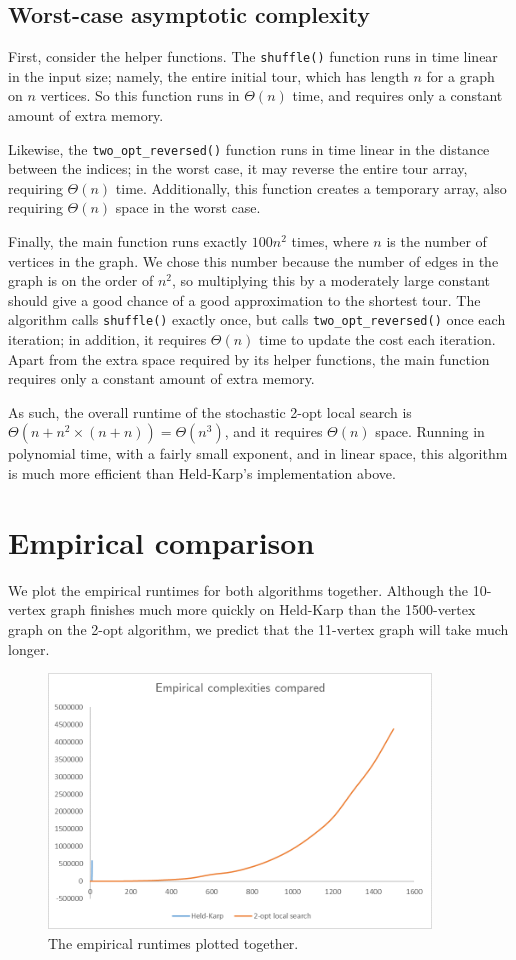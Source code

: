 \documentclass[10pt]{extarticle}
\begin{document}
\subsection{Worst-case asymptotic complexity}
First, consider the helper functions. The \verb|shuffle()| function runs in time
linear in the input size; namely, the entire initial tour, which has length $n$
for a graph on $n$ vertices. So this function runs in $\Theta(n)$ time, and 
requires only a constant amount of extra memory.

Likewise, the \verb|two_opt_reversed()| function runs in time linear in the
distance between the indices; in the worst case, it may reverse the entire 
tour array, requiring $\Theta(n)$ time. Additionally, this function creates a
temporary array, also requiring $\Theta(n)$ space in the worst case.

Finally, the main function runs exactly $100 n^2$ times, where $n$ is the 
number of vertices in the graph. We chose this number because the number of 
edges in the graph is on the order of $n^2$, so multiplying this by a moderately
large constant should give a good chance of a good approximation to the shortest
tour. The algorithm calls \verb|shuffle()| exactly once, but calls
\verb|two_opt_reversed()| once each iteration; in addition, it requires 
$\Theta(n)$ time to update the cost each iteration. Apart from the extra space
required by its helper functions, the main function requires only a constant 
amount of extra memory.

As such, the overall runtime of the stochastic 2-opt local search is
$\Theta(n + n^2 \times (n + n)) = \Theta(n^3)$, and it requires $\Theta(n)$
space. Running in polynomial time, with a fairly small exponent, and in linear
space, this algorithm is much more efficient than Held-Karp's implementation
above. \medskip



\section{Empirical comparison}
We plot the empirical runtimes for both algorithms together. Although the 10-
vertex graph finishes much more quickly on Held-Karp than the 1500-vertex
graph on the 2-opt algorithm, we predict that the 11-vertex graph will take
much longer.

\begin{figure}[ht]
    \centering
    \includegraphics[width=4in]{bothGraphed.png}
    \caption{The empirical runtimes plotted together.}
    \label{fig:my_label}
\end{figure}
\end{document}
